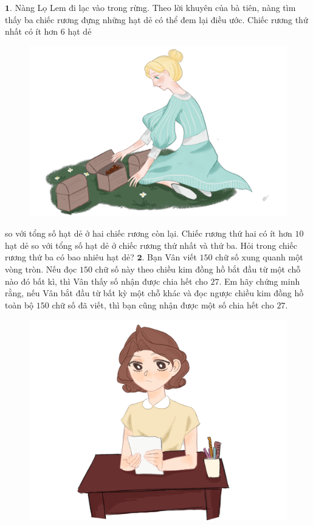 \begin{multicols}{2}
	$\pmb{1.}$ Nàng Lọ Lem đi lạc vào trong rừng. Theo lời khuyên của bà tiên, nàng tìm thấy ba chiếc rương đựng những hạt dẻ có thể đem lại điều ước. Chiếc rương thứ nhất có ít hơn $6$ hạt dẻ
	\begin{figure}[H]
		\centering
		\vspace*{-5pt}
		\captionsetup{labelformat= empty, justification=centering}
		\includegraphics[width=1\linewidth]{Hinh1}
		\vspace*{-5pt}
	\end{figure}
	so với  tổng số hạt dẻ ở hai chiếc rương còn lại. Chiếc rương thứ hai có ít hơn $10$ hạt dẻ so với tổng số hạt dẻ ở chiếc rương thứ nhất và thứ ba. Hỏi trong chiếc rương thứ ba có bao nhiêu hạt dẻ?
	\vskip 0.1cm
	$\pmb{2.}$ Bạn Vân viết $150$ chữ số xung quanh một vòng tròn. Nếu đọc $150$ chữ số này theo chiều kim đồng hồ bắt đầu từ một chỗ nào đó bất kì, thì Vân thấy số nhận được chia hết cho $27$. Em hãy chứng minh rằng, nếu Vân bắt đầu từ bất kỳ một chỗ khác và đọc ngược chiều kim đồng hồ toàn bộ $150$ chữ số đã viết, thì bạn cũng nhận được một số chia hết cho $27$.
	\begin{figure}[H]
		\centering
		\captionsetup{labelformat= empty, justification=centering}
		\includegraphics[width=0.85\linewidth]{Hinh2}

\end{figure}
\end{multicols}
